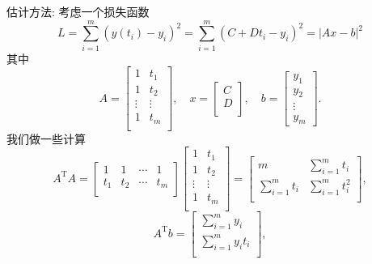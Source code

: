 估计方法: 考虑一个损失函数
\begin{equation}
  L = \sum_{i=1}^{m} \left( y(t_i)  - y_i \right) ^{2} = \sum_{i=1}^{m} \left( C + D t_i  - y_i \right) ^{2} = \left| Ax -b \right| ^{2}
\end{equation}
其中
\begin{equation}
  A = \begin{bmatrix}
   1 & t_1\\
   1 & t_2\\
   \vdots & \vdots\\
   1 & t_m\\
  \end{bmatrix},
  \quad 
  x = \begin{bmatrix}
   C\\
   D\\
  \end{bmatrix},
  \quad 
  b = \begin{bmatrix} 
  y_1 \\ 
  y_2 \\ 
  \vdots \\ 
  y_m 
  \end{bmatrix}.
\end{equation}
我们做一些计算\
\begin{equation}
  A^{\mathrm{T}}A = \begin{bmatrix}
   1 & 1 & \cdots & 1\\
   t_1 & t_2 & \cdots & t_m\\
  \end{bmatrix}
  \begin{bmatrix}
    1 & t_1\\
    1 & t_2\\
    \vdots & \vdots\\
    1 & t_m\\
   \end{bmatrix}
   =
   \begin{bmatrix}
    m & \sum_{i=1}^{m} t_i\\
    \sum_{i=1}^{m} t_i & \sum_{i=1}^{m} t_i^{2}\\
   \end{bmatrix},
\end{equation}
\begin{equation}
  A^{\mathrm{T}}b = \begin{bmatrix}
   \sum_{i=1}^{m} y_i\\
   \sum_{i=1}^{m} y_i t_i\\
  \end{bmatrix},
\end{equation}
